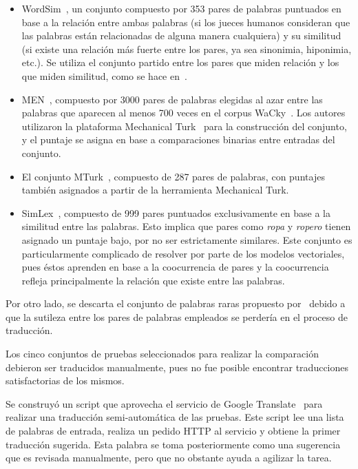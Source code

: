 \begin{itemize}

\item WordSim~\cite{Finkelstein2002}, un conjunto compuesto por 353 pares de palabras puntuados en
base a la relación entre ambas palabras (si los jueces humanos consideran que las palabras están
relacionadas de alguna manera cualquiera) y su similitud (si existe una relación más fuerte entre
los pares, ya sea sinonimia, hiponimia, etc.). Se utiliza el conjunto partido entre los pares que
miden relación y los que miden similitud, como se hace en~\cite{Levy2015}.

\item MEN~\cite{Bruni2012}, compuesto por 3000 pares de palabras elegidas al azar entre las palabras
que aparecen al menos 700 veces en el corpus WaCky~\cite{Wacky2009}. Los autores utilizaron la
plataforma Mechanical Turk~\cite{MechanicalTurk} para la construcción del conjunto, y el puntaje se
asigna en base a comparaciones binarias entre entradas del conjunto.

\item El conjunto MTurk~\cite{Radinsky2011}, compuesto de 287 pares de palabras, con puntajes
también asignados a partir de la herramienta Mechanical Turk.

\item SimLex~\cite{Hill2014}, compuesto de 999 pares puntuados exclusivamente en base a la similitud
entre las palabras. Esto implica que pares como \textit{ropa} y \textit{ropero} tienen asignado un
puntaje bajo, por no ser estrictamente similares. Este conjunto es particularmente complicado de
resolver por parte de los modelos vectoriales, pues éstos aprenden en base a la coocurrencia de
pares y la coocurrencia refleja principalmente la relación que existe entre las palabras.

\end{itemize}

Por otro lado, se descarta el conjunto de palabras raras propuesto por~\cite{Luong2013} debido a que
la sutileza entre los pares de palabras empleados se perdería en el proceso de traducción.


Los cinco conjuntos de pruebas seleccionados para realizar la comparación debieron ser traducidos
manualmente, pues no fue posible encontrar traducciones satisfactorias de los mismos.

Se construyó un script que aprovecha el servicio de Google Translate~\cite{GoogleTranslate} para
realizar una traducción semi-automática de las pruebas. Este script lee una lista de palabras de
entrada, realiza un pedido HTTP al servicio y obtiene la primer traducción sugerida. Esta palabra se
toma posteriormente como una sugerencia que es revisada manualmente, pero que no obstante ayuda a
agilizar la tarea.

